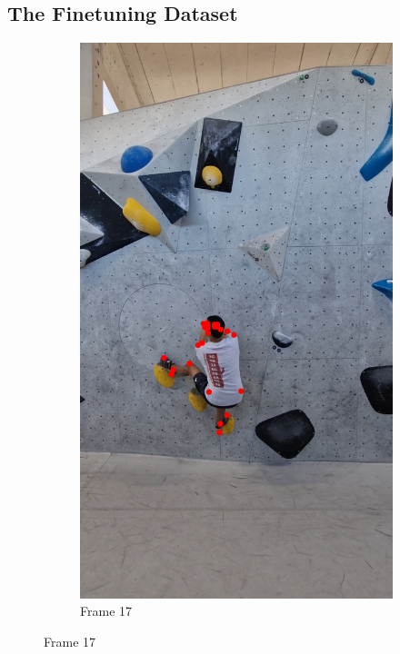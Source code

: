 \documentclass[./main.tex]{subfiles}
\begin{document}
\subsection{The Finetuning Dataset}
\label{sec:ClimbAlong}
\begin{figure}[htbp]
    \centering
    \begin{subfigure}{0.3\textwidth}
        \centering
        \includegraphics[width=\textwidth]{entities/CA_17.png}
        \caption{Frame 17}
    \end{subfigure}

\end{figure}
\end{document}
